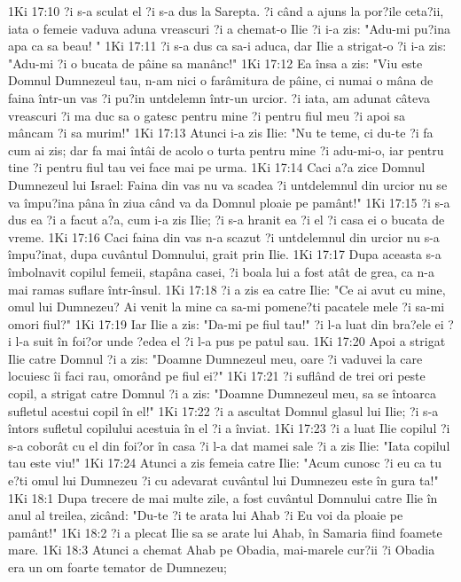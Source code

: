 1Ki 17:10  ?i s-a sculat el ?i s-a dus la Sarepta. ?i când a ajuns la por?ile ceta?ii, iata o femeie vaduva aduna vreascuri ?i a chemat-o Ilie ?i i-a zis: "Adu-mi pu?ina apa ca sa beau! "
1Ki 17:11  ?i s-a dus ca sa-i aduca, dar Ilie a strigat-o ?i i-a zis: "Adu-mi ?i o bucata de pâine sa manânc!"
1Ki 17:12  Ea însa a zis: "Viu este Domnul Dumnezeul tau, n-am nici o farâmitura de pâine, ci numai o mâna de faina într-un vas ?i pu?in untdelemn într-un urcior. ?i iata, am adunat câteva vreascuri ?i ma duc sa o gatesc pentru mine ?i pentru fiul meu ?i apoi sa mâncam ?i sa murim!"
1Ki 17:13  Atunci i-a zis Ilie: "Nu te teme, ci du-te ?i fa cum ai zis; dar fa mai întâi de acolo o turta pentru mine ?i adu-mi-o, iar pentru tine ?i pentru fiul tau vei face mai pe urma.
1Ki 17:14  Caci a?a zice Domnul Dumnezeul lui Israel: Faina din vas nu va scadea ?i untdelemnul din urcior nu se va împu?ina pâna în ziua când va da Domnul ploaie pe pamânt!"
1Ki 17:15  ?i s-a dus ea ?i a facut a?a, cum i-a zis Ilie; ?i s-a hranit ea ?i el ?i casa ei o bucata de vreme.
1Ki 17:16  Caci faina din vas n-a scazut ?i untdelemnul din urcior nu s-a împu?inat, dupa cuvântul Domnului, grait prin Ilie.
1Ki 17:17  Dupa aceasta s-a îmbolnavit copilul femeii, stapâna casei, ?i boala lui a fost atât de grea, ca n-a mai ramas suflare într-însul.
1Ki 17:18  ?i a zis ea catre Ilie: "Ce ai avut cu mine, omul lui Dumnezeu? Ai venit la mine ca sa-mi pomene?ti pacatele mele ?i sa-mi omori fiul?"
1Ki 17:19  Iar Ilie a zis: "Da-mi pe fiul tau!" ?i l-a luat din bra?ele ei ?i l-a suit în foi?or unde ?edea el ?i l-a pus pe patul sau.
1Ki 17:20  Apoi a strigat Ilie catre Domnul ?i a zis: "Doamne Dumnezeul meu, oare ?i vaduvei la care locuiesc îi faci rau, omorând pe fiul ei?"
1Ki 17:21  ?i suflând de trei ori peste copil, a strigat catre Domnul ?i a zis: "Doamne Dumnezeul meu, sa se întoarca sufletul acestui copil în el!"
1Ki 17:22  ?i a ascultat Domnul glasul lui Ilie; ?i s-a întors sufletul copilului acestuia în el ?i a înviat.
1Ki 17:23  ?i a luat Ilie copilul ?i s-a coborât cu el din foi?or în casa ?i l-a dat mamei sale ?i a zis Ilie: "Iata copilul tau este viu!"
1Ki 17:24  Atunci a zis femeia catre Ilie: "Acum cunosc ?i eu ca tu e?ti omul lui Dumnezeu ?i cu adevarat cuvântul lui Dumnezeu este în gura ta!"
1Ki 18:1  Dupa trecere de mai multe zile, a fost cuvântul Domnului catre Ilie în anul al treilea, zicând: "Du-te ?i te arata lui Ahab ?i Eu voi da ploaie pe pamânt!"
1Ki 18:2  ?i a plecat Ilie sa se arate lui Ahab, în Samaria fiind foamete mare.
1Ki 18:3  Atunci a chemat Ahab pe Obadia, mai-marele cur?ii ?i Obadia era un om foarte temator de Dumnezeu;

